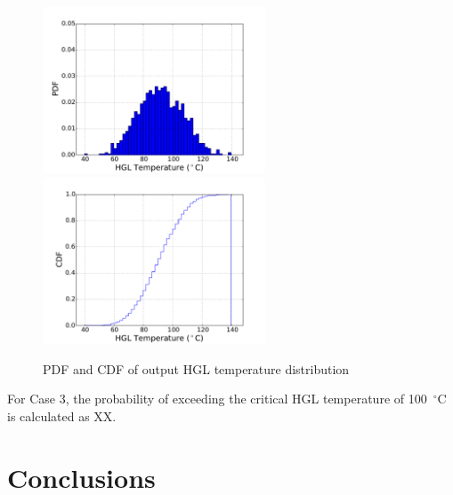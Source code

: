 \documentclass[12pt]{article}
\begin{document}
\begin{figure}[!ht]
\includegraphics[width=2.6in]{Figures/output_PDF_3_combined}
\includegraphics[width=2.6in]{Figures/output_CDF_3_combined}
\caption{PDF and CDF of output HGL temperature distribution}
\label{fig:case_3_output_distributions}
\end{figure}

For Case 3, the probability of exceeding the critical HGL temperature of 100~$^\circ$C is calculated as XX.


\section{Conclusions}
\label{sec:conclusions}




\end{document}
